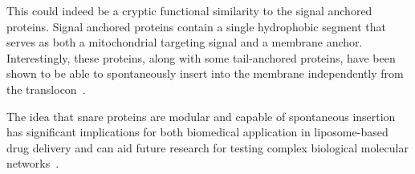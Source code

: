 This could indeed be a cryptic functional similarity to the signal anchored proteins.
Signal anchored proteins contain a single hydrophobic segment that serves as both a mitochondrial targeting signal and a membrane anchor.
Interestingly, these proteins, along with some tail-anchored proteins, have been shown to be able to spontaneously insert into the membrane independently from the translocon~\cite{Elisa2012, Lan2000, Colombo2009}.

The idea that \gls{snare} proteins are modular and capable of spontaneous insertion has significant implications for both biomedical application in liposome-based drug delivery and can aid future research for testing complex biological molecular networks~\cite{Allen2013, Nordlund2014}.
